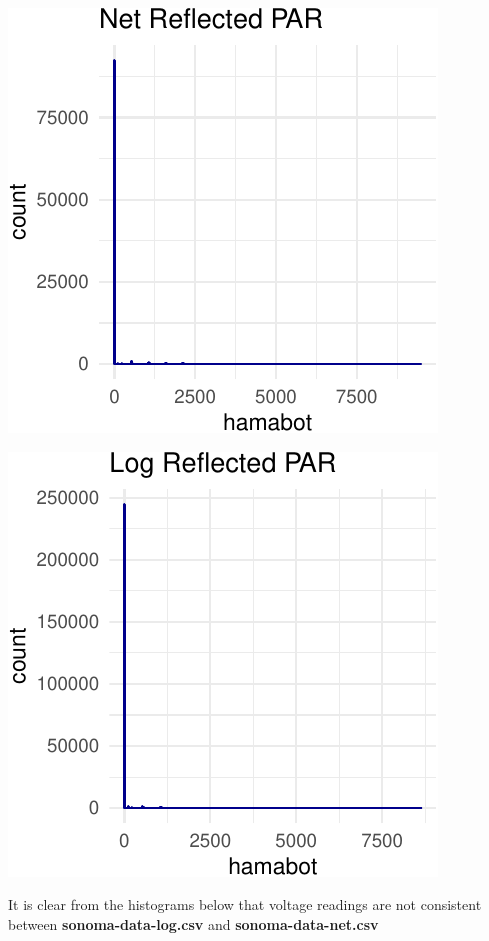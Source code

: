 \documentclass[]{article}
\begin{document}
\begin{center}\includegraphics{Project1WriteUp_files/figure-latex/unnamed-chunk-3-1} \end{center}

\begin{center}\includegraphics{Project1WriteUp_files/figure-latex/unnamed-chunk-3-2} \end{center}

It is clear from the histograms below that voltage readings are not
consistent between \textbf{sonoma-data-log.csv} and
\textbf{sonoma-data-net.csv}
\end{document}
